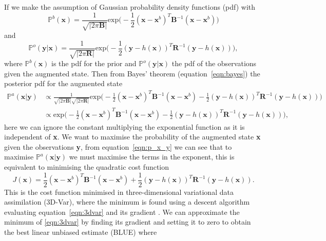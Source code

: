 \documentclass[12pt]{article}
\begin{document}
If we make the assumption of Gaussian probability density functions (pdf) with
\begin{equation}
\mathbb{P}^{b}(\textbf{x}) = \frac{1}{\sqrt{|2\pi\textbf{B}|}}\text{exp}\big(-\frac{1}{2}(\textbf{x}-\textbf{x}^{b})^{T}\textbf{B}^{-1}(\textbf{x}-\textbf{x}^{b})\big)
\end{equation}
and
\begin{equation}
\mathbb{P}^{o}(\textbf{y}|\textbf{x}) = \frac{1}{\sqrt{|2\pi\textbf{R}|}}\text{exp}\big(-\frac{1}{2}(\textbf{y}-h(\textbf{x}))^{T}\textbf{R}^{-1}(\textbf{y}-h(\textbf{x}))\big),
\end{equation}
where \(\mathbb{P}^{b}(\textbf{x})\) is the pdf for the prior and \(\mathbb{P}^{o}(\textbf{y}|\textbf{x})\) the pdf of the observations given the augmented state. Then from Bayes' theorem (equation~\eqref{eqn:bayes}) the posterior pdf for the augmented state
\begin{equation}
\begin{split}
\mathbb{P}^{a}(\textbf{x}|\textbf{y}) &\propto \frac{1}{\sqrt{|2\pi\textbf{B}|}\sqrt{|2\pi\textbf{R}|}}\text{exp}\big(-\frac{1}{2}(\textbf{x}-\textbf{x}^{b})^{T}\textbf{B}^{-1}(\textbf{x}-\textbf{x}^{b})-\frac{1}{2}(\textbf{y}-h(\textbf{x}))^{T}\textbf{R}^{-1}(\textbf{y}-h(\textbf{x}))\big) \\
&\propto \text{exp}\big(-\frac{1}{2}(\textbf{x}-\textbf{x}^{b})^{T}\textbf{B}^{-1}(\textbf{x}-\textbf{x}^{b})-\frac{1}{2}(\textbf{y}-h(\textbf{x}))^{T}\textbf{R}^{-1}(\textbf{y}-h(\textbf{x}))\big), \label{eqn:p_x_y}
\end{split}
\end{equation} 
here we can ignore the constant multiplying the exponential function as it is independent of \textbf{x}. We want to maximise the probability of the augmented state \textbf{x} given the observations \textbf{y}, from equation~\eqref{eqn:p_x_y} we can see that to maximise \(\mathbb{P}^{a}(\textbf{x}|\textbf{y})\) we must maximise the terms in the exponent, this is equivalent to minimising the quadratic cost function 
\begin{equation}
J(\textbf{x}) = \frac{1}{2}(\textbf{x}-\textbf{x}^{b})^{T}\textbf{B}^{-1}(\textbf{x}-\textbf{x}^{b}) + \frac{1}{2}(\textbf{y}-h(\textbf{x}))^{T}\textbf{R}^{-1}(\textbf{y}-h(\textbf{x})). \label{eqn:3dvar}
\end{equation}
This is the cost function minimised in three-dimensional variational data assimilation (3D-Var), where the minimum is found using a descent algorithm evaluating equation~\eqref{eqn:3dvar} and its gradient \citep{courtier1998ecmwf}. We can approximate the minimum of \eqref{eqn:3dvar} by finding its gradient and setting it to zero to obtain the best linear unbiased estimate (BLUE) \citep{talagrand1997assimilation} where
\end{document}
